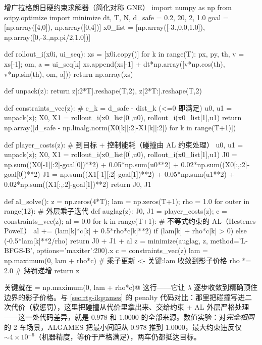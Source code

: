 \begin{codebox}[Python]{增广拉格朗日硬约束求解器（简化对称 GNE）}
import numpy as np
from scipy.optimize import minimize
dt, T, N, d_safe = 0.2, 20, 2, 1.0
goal = [np.array([4,0]), np.array([0,4])]
x0_list = [np.array([-3.,0,0,1.0]), np.array([0,-3.,np.pi/2,1.0])]

def rollout_i(x0i, ui_seq):
    xs = [x0i.copy()]
    for k in range(T):
        px, py, th, v = xs[-1]; om, a = ui_seq[k]
        xs.append(xs[-1] + dt*np.array([v*np.cos(th), v*np.sin(th), om, a]))
    return np.array(xs)

def unpack(z): return z[:2*T].reshape(T,2), z[2*T:].reshape(T,2)

def constraints_vec(z):                              # c_k = d_safe - dist_k (<=0 即满足)
    u0, u1 = unpack(z); X0, X1 = rollout_i(x0_list[0],u0), rollout_i(x0_list[1],u1)
    return np.array([d_safe - np.linalg.norm(X0[k][:2]-X1[k][:2]) for k in range(T+1)])

def player_costs(z):                                 # 到目标 + 控制能耗（碰撞由 AL 约束处理）
    u0, u1 = unpack(z); X0, X1 = rollout_i(x0_list[0],u0), rollout_i(x0_list[1],u1)
    J0 = np.sum((X0[-1][:2]-goal[0])**2) + 0.05*np.sum(u0**2) + 0.02*np.sum((X0[:,:2]-goal[0])**2)
    J1 = np.sum((X1[-1][:2]-goal[1])**2) + 0.05*np.sum(u1**2) + 0.02*np.sum((X1[:,:2]-goal[1])**2)
    return J0, J1

def al_solve():
    z = np.zeros(4*T); lam = np.zeros(T+1); rho = 1.0
    for outer in range(12):                          # 外层乘子迭代
        def auglag(z):
            J0, J1 = player_costs(z); c = constraints_vec(z); al = 0.0
            for k in range(T+1):                     # 不等式约束的 AL（Hestenes-Powell）
                al += (lam[k]*c[k] + 0.5*rho*c[k]**2) if (lam[k] + rho*c[k] > 0) else (-0.5*lam[k]**2/rho)
            return J0 + J1 + al
        z = minimize(auglag, z, method='L-BFGS-B', options={'maxiter':200}).x
        c = constraints_vec(z)
        lam = np.maximum(0, lam + rho*c)             # 乘子更新 <- 关键:lam 收敛到影子价格
        rho *= 2.0                                    # 惩罚递增
    return z
\end{codebox}

\noindent 关键就在 \verb@lam = np.maximum(0, lam + rho*c)@ 这行——它让 $\lambda$ 逐步收敛到精确顶住边界的影子价格。与 \cref{sec:rtg-ilqgames} 的 penalty 代码对比：那里把碰撞写进二次代价（软惩罚），这里把碰撞从代价里拿出来、交给约束 + AL 外层严格处理——这一处代码差异，就是 $0.978$ 和 $1.0000$ 的全部来源。数值实验：对\emph{完全相同}的 2 车场景，ALGAMES 把最小间距从 $0.978$ 推到 $1.0000$，最大约束违反仅 $\sim4\times10^{-6}$（机器精度，等价于严格满足），两车仍都抵达目标\cite{lecleach2022algames}。

